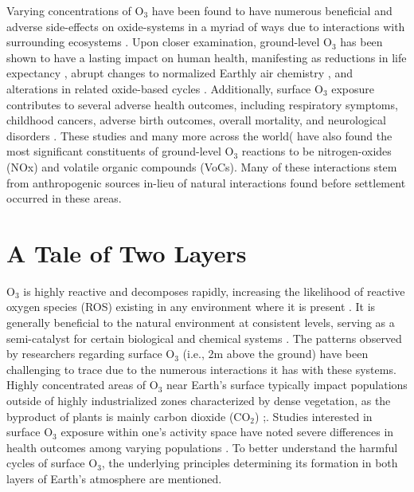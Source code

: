 Varying concentrations of O$_3$ have been found to have numerous beneficial and adverse side-effects on oxide-systems in a myriad of ways due to interactions with surrounding ecosystems \parencite{ding_investigating_2021,epa_integrated_2020,manes_regulating_2016}. Upon closer examination, ground-level O$_3$ has been shown to have a lasting impact on human health, manifesting as reductions in life expectancy \parencite{zhang_effect_2019,turner_long-term_2016}, abrupt changes to normalized Earthly air chemistry \parencite{lin_spatiotemporal_2016,wu_hybrid_2023}, and alterations in related oxide-based cycles \parencite{barzeghar_long-term_2020,ding_investigating_2021}. Additionally, surface O$_3$ exposure contributes to several adverse health outcomes, including respiratory symptoms, childhood cancers, adverse birth outcomes, overall mortality, and neurological disorders \parencite{buadong_association_2009,ghozikali_effect_2015,tang_impact_2024,turner_long-term_2016}. These studies and many more across the world( \cite{brown-steiner_asian_2011,cheng_estimator_2018,girach_changes_2012} have also found the most significant constituents of ground-level O$_3$ reactions to be nitrogen-oxides (NOx) and volatile organic compounds (VoCs). Many of these interactions stem from anthropogenic sources \parencite{danyang_ma_effect_2023,chauhan_rising_2023} in-lieu of natural interactions found before settlement occurred in these areas. 
\section{A Tale of Two Layers} \label{introchap:twolayers} O$_3$ is highly reactive and decomposes rapidly, increasing the likelihood of reactive oxygen species (ROS) existing in any environment where it is present \parencite{voter_ozone_2001,bocci_studies_1998}. It is generally beneficial to the natural environment at consistent levels, serving as a semi-catalyst for certain biological and chemical systems \parencite{wiley_ozone_2017}. The patterns observed by researchers regarding surface O$_3$ (i.e., 2m above the ground) have been challenging to trace due to the numerous interactions it has with these systems. Highly concentrated areas of O$_3$ near Earth’s surface typically impact populations outside of highly industrialized zones characterized by dense vegetation, as the byproduct of plants is mainly carbon dioxide (CO$_2$) \parencite{lei_impacts_2024,sadiq_effects_2016};\cite{yadong_lei_indirect_2021}. Studies interested in surface O$_3$ exposure within one’s activity space have noted severe differences in health outcomes among varying populations \parencite{crouse_ambient_2015,ekland_effect_2021,malley_updated_2017,fu_prenatal_2020,tang_impact_2024}. To better understand the harmful cycles of surface O$_3$, the underlying principles determining its formation in both layers of Earth’s atmosphere are mentioned. 


